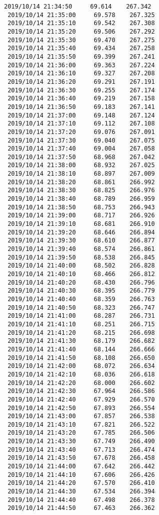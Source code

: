 \documentclass[11pt]{article}
\begin{document}
\begin{Verbatim}[commandchars=\\\{\}]
 2019/10/14 21:34:50     69.614    267.342
 2019/10/14 21:35:00     69.578    267.325
 2019/10/14 21:35:10     69.542    267.308
 2019/10/14 21:35:20     69.506    267.292
 2019/10/14 21:35:30     69.470    267.275
 2019/10/14 21:35:40     69.434    267.258
 2019/10/14 21:35:50     69.399    267.241
 2019/10/14 21:36:00     69.363    267.224
 2019/10/14 21:36:10     69.327    267.208
 2019/10/14 21:36:20     69.291    267.191
 2019/10/14 21:36:30     69.255    267.174
 2019/10/14 21:36:40     69.219    267.158
 2019/10/14 21:36:50     69.183    267.141
 2019/10/14 21:37:00     69.148    267.124
 2019/10/14 21:37:10     69.112    267.108
 2019/10/14 21:37:20     69.076    267.091
 2019/10/14 21:37:30     69.040    267.075
 2019/10/14 21:37:40     69.004    267.058
 2019/10/14 21:37:50     68.968    267.042
 2019/10/14 21:38:00     68.932    267.025
 2019/10/14 21:38:10     68.897    267.009
 2019/10/14 21:38:20     68.861    266.992
 2019/10/14 21:38:30     68.825    266.976
 2019/10/14 21:38:40     68.789    266.959
 2019/10/14 21:38:50     68.753    266.943
 2019/10/14 21:39:00     68.717    266.926
 2019/10/14 21:39:10     68.681    266.910
 2019/10/14 21:39:20     68.646    266.894
 2019/10/14 21:39:30     68.610    266.877
 2019/10/14 21:39:40     68.574    266.861
 2019/10/14 21:39:50     68.538    266.845
 2019/10/14 21:40:00     68.502    266.828
 2019/10/14 21:40:10     68.466    266.812
 2019/10/14 21:40:20     68.430    266.796
 2019/10/14 21:40:30     68.395    266.779
 2019/10/14 21:40:40     68.359    266.763
 2019/10/14 21:40:50     68.323    266.747
 2019/10/14 21:41:00     68.287    266.731
 2019/10/14 21:41:10     68.251    266.715
 2019/10/14 21:41:20     68.215    266.698
 2019/10/14 21:41:30     68.179    266.682
 2019/10/14 21:41:40     68.144    266.666
 2019/10/14 21:41:50     68.108    266.650
 2019/10/14 21:42:00     68.072    266.634
 2019/10/14 21:42:10     68.036    266.618
 2019/10/14 21:42:20     68.000    266.602
 2019/10/14 21:42:30     67.964    266.586
 2019/10/14 21:42:40     67.929    266.570
 2019/10/14 21:42:50     67.893    266.554
 2019/10/14 21:43:00     67.857    266.538
 2019/10/14 21:43:10     67.821    266.522
 2019/10/14 21:43:20     67.785    266.506
 2019/10/14 21:43:30     67.749    266.490
 2019/10/14 21:43:40     67.713    266.474
 2019/10/14 21:43:50     67.678    266.458
 2019/10/14 21:44:00     67.642    266.442
 2019/10/14 21:44:10     67.606    266.426
 2019/10/14 21:44:20     67.570    266.410
 2019/10/14 21:44:30     67.534    266.394
 2019/10/14 21:44:40     67.498    266.378
 2019/10/14 21:44:50     67.463    266.362

\end{Verbatim}
\end{document}
